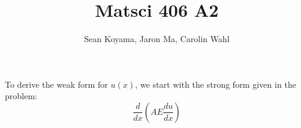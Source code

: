 \documentclass[12pt]{article}
\title{Matsci 406 A2}
\author{Sean Koyama, Jaron Ma, Carolin Wahl}
\begin{document}
\maketitle

\section{}
To derive the weak form for $u(x)$, we start with the strong form given in the problem:
$$
\frac{d}{dx}\left(AE\frac{du}{dx}\right)
$$
\end{document}
